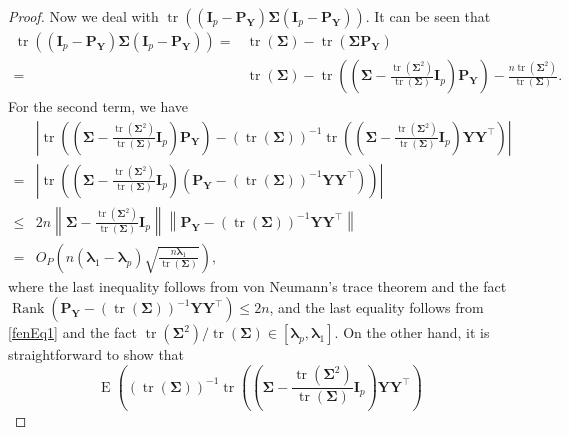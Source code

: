\documentclass[12pt]{article} %
\DeclareMathOperator{\mytr}{tr}
\DeclareMathOperator{\myrank}{Rank}
\DeclareMathOperator{\myE}{E}
\newcommand{\bP}{\mathbf{P}}
\newcommand{\bY}{\mathbf{Y}}
\newcommand{\bI}{\mathbf{I}}
\newcommand{\bfsym}[1]{\ensuremath{\boldsymbol{#1}}}
\def\blambda {\bfsym {\lambda}}
\def\bSigma {\bfsym {\Sigma}}
\theoremstyle{definition}
\begin{document}
\begin{appendices}
\begin{proof}
        Now we deal with $
        \mytr \left( (\bI_p-\bP_{\bY})\bSigma (\bI_p-\bP_{\bY})\right)
        $.
        It can be seen that
        \begin{equation}\label{fenEq2}
        \begin{split}
        \mytr \left( (\bI_p-\bP_{\bY})\bSigma (\bI_p-\bP_{\bY})\right)
        =&
        \mytr \left(\bSigma \right)-
        \mytr \left(\bSigma\bP_{\bY}\right)
        \\
        =&
        \mytr \left(\bSigma \right)-
        \mytr \left(\left(\bSigma - \frac{\mytr(\bSigma^2)}{\mytr(\bSigma)} \bI_p \right)\bP_{\bY}\right)
        -\frac{n\mytr(\bSigma^2)}{\mytr(\bSigma)}
        .
        \end{split}
    \end{equation}
    For the second term, we have
    \begin{equation*}
        \begin{split}
        &\left|
        \mytr \left(\left(\bSigma - \frac{\mytr(\bSigma^2)}{\mytr(\bSigma)} \bI_p \right)\bP_{\bY}\right)
        -
        \left(\mytr(\bSigma)\right)^{-1}\mytr \left(\left(\bSigma - \frac{\mytr(\bSigma^2)}{\mytr(\bSigma)} \bI_p \right)\bY \bY^\top\right)
        \right|
        \\
        =&\left|\mytr \left(\left(\bSigma - \frac{\mytr(\bSigma^2)}{\mytr(\bSigma)} \bI_p \right)\left(\bP_{\bY}- \left(\mytr(\bSigma)\right)^{-1}\bY\bY^\top \right)\right)
        \right|
        \\
        \leq&
2n 
\left\|
\bSigma - \frac{\mytr(\bSigma^2)}{\mytr(\bSigma)} \bI_p
\right\|
\left\|
\bP_{\bY}- \left(\mytr(\bSigma)\right)^{-1}\bY\bY^\top 
\right\|
        \\
        =&
        O_P\left(
            n(\blambda_1-\blambda_p)\sqrt{\frac{n\blambda_1}{\mytr(\bSigma)}}
        \right)
,
        \end{split}
    \end{equation*}
    where the last inequality follows from von Neumann's trace theorem and the fact $\myrank\left( \bP_{\bY}-\left(\mytr(\bSigma)\right)^{-1}\bY\bY^\top \right)\leq 2n$, and the last equality follows from \eqref{fenEq1}
    and the fact $\mytr(\bSigma^2)/\mytr(\bSigma)\in [\blambda_p, \blambda_1]$.
    On the other hand, it is straightforward to show that
    \begin{equation*}
        \myE \left(
        \left(\mytr(\bSigma)\right)^{-1}\mytr \left(\left(\bSigma - \frac{\mytr(\bSigma^2)}{\mytr(\bSigma)} \bI_p \right)\bY \bY^\top\right)

\end{equation*}
\end{proof}
\end{appendices}
\end{document}
